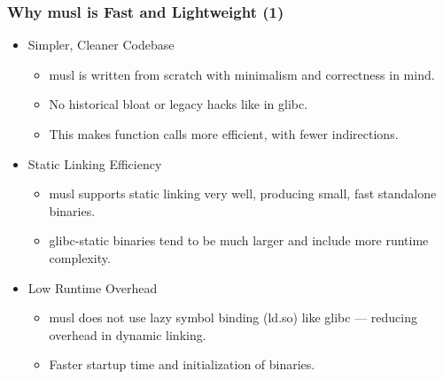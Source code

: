 \begin{frame}
  \frametitle{Why musl is Fast and Lightweight (1)}
  \begin{itemize}
  \item Simpler, Cleaner Codebase
    \begin{itemize}
    \item musl is written from scratch with minimalism and correctness in mind.
    \item No historical bloat or legacy hacks like in glibc.
    \item This makes function calls more efficient, with fewer indirections.
    \end{itemize}
  \item Static Linking Efficiency
    \begin{itemize}
    \item musl supports static linking very well, producing small,
    fast standalone binaries.
    \item glibc-static binaries tend to be much larger and include more
    runtime complexity.
    \end{itemize}
  \item Low Runtime Overhead
    \begin{itemize}
      \item musl does not use lazy symbol binding (ld.so) like glibc —
      reducing overhead in dynamic linking.
      \item Faster startup time and initialization of binaries.
    \end{itemize}
  \end{itemize}
\end{frame}

